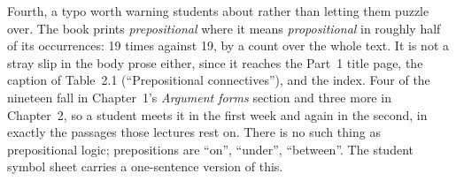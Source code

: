 \documentclass[11pt]{article}
\begin{document}
Fourth, a typo worth warning students about rather than letting them puzzle over. The book prints \emph{prepositional} where it means \emph{propositional} in roughly half of its occurrences: 19 times against 19, by a count over the whole text. It is not a stray slip in the body prose either, since it reaches the Part~1 title page, the caption of Table~2.1 (``Prepositional connectives''), and the index. Four of the nineteen fall in Chapter~1's \emph{Argument forms} section and three more in Chapter~2, so a student meets it in the first week and again in the second, in exactly the passages those lectures rest on. There is no such thing as prepositional logic; prepositions are ``on'', ``under'', ``between''. The student symbol sheet carries a one-sentence version of this.
\end{document}
